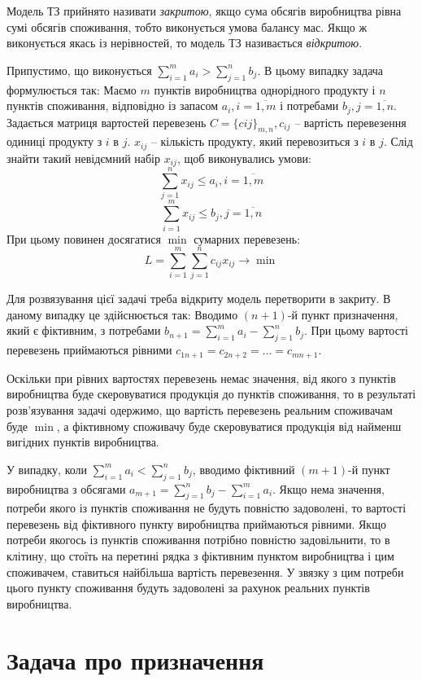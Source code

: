 \documentclass[12pt,a4paper]{book}
\begin{document}
Модель ТЗ прийнято називати \emph{закритою}, якщо сума обсягів виробництва рівна сумі обсягів споживання, тобто виконується умова балансу мас. Якщо ж виконується якась із нерівностей, то модель ТЗ називається \emph{відкритою}.

Припустимо, що виконується $\sum_{i=1}^m a_i > \sum_{j=1}^n b_j$. В цьому випадку задача формулюється так:
Маємо $m$ пунктів виробництва однорідного продукту і $n$ пунктів споживання, відповідно із запасом $a_i, i=\overline{1,m}$ і потребами $b_j, j=\overline{1,n}$. Задається матриця вартостей перевезень $C=\{cij\}_{m,n}, c_{ij}$ – вартість перевезення одиниці продукту з $i$ в $j$. $x_{ij}$ – кількість продукту, який перевозиться з $i$ в $j$.
Слід знайти такий невідємний набір $x_{ij}$, щоб виконувались умови:
\[ \sum_{j=1}^n x_{ij} \leq a_i, i=\overline{1,m} \]
\[ \sum_{i=1}^m x_{ij} \leq b_j, j=\overline{1,n} \]
При цьому повинен досягатися $\min$ сумарних перевезень:
\[ L = \sum_{i=1}^m \sum_{j=1}^n c_{ij} x_{ij} \to \min \]

Для розвязування цієї задачі треба відкриту модель перетворити в закриту. В даному випадку це здійснюється так:
Вводимо $(n+1)$-й пункт призначення, який є фіктивним, з потребами $b_{n+1} = \sum_{i=1}^m a_i - \sum_{j=1}^n b_j$. При цьому вартості перевезень приймаються рівними $c_{1 n+1} = c_{2 n+2} = \dots = c_{m n+1}$.

Оскільки при рівних вартостях перевезень немає значення, від якого з пунктів виробництва буде скеровуватися продукція до пунктів споживання, то в результаті розв’язування задачі одержимо, що вартість перевезень реальним споживачам буде $\min$, а фіктивному споживачу буде скеровуватися продукція від найменш вигідних пунктів виробництва.

У випадку, коли $\sum_{i=1}^m a_i < \sum_{j=1}^n b_j$, вводимо фіктивний $(m+1)$-й пункт виробництва з обсягами $a_{m+1} = \sum_{j=1}^n b_j - \sum_{i=1}^m a_i$. Якщо нема значення, потреби якого із пунктів споживання не будуть повністю задоволені, то вартості перевезень від фіктивного пункту виробництва приймаються рівними. Якщо потреби якогось із пунктів споживання потрібно повністю задовільнити, то в клітину, що стоїть на перетині рядка з фіктивним пунктом виробництва і цим споживачем, ставиться найбільша вартість перевезення. У звязку з цим потреби цього пункту споживання будуть задоволені за рахунок реальних пунктів виробництва.

\section{Задача про призначення}
\end{document}
